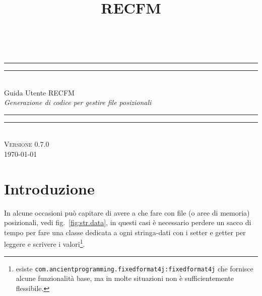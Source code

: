 \documentclass[a4paper,10pt]{report}
\title{RECFM}
\begin{document}
\begin{titlepage}
\newlength{\drop}%
\textheight
\centering
\settowidth{\unitlength}{\large\itshape Generazione di codice per gestire file posizionali}
\vspace*{\baselineskip}
\\[\baselineskip]
\rule{\unitlength}{1.6pt}\vspace*{-\baselineskip}\vspace*{2pt}
\rule{\unitlength}{0.4pt}\\[\baselineskip]
{\Huge Guida Utente RECFM}\\[\baselineskip]
{\large\itshape Generazione di codice per gestire file posizionali}\\[0.2\baselineskip]
\rule{\unitlength}{0.4pt}\vspace*{-\baselineskip}\vspace{3.2pt}
\rule{\unitlength}{1.6pt}\\[\baselineskip]
\vfill
{\large\scshape Versione 0.7.0}\\[\baselineskip]
{\small\scshape \today}\par
\vspace*{\drop}
\end{titlepage}


\section*{Introduzione}
In alcune occasioni può capitare di avere a che fare con file (o aree di 
memoria) posizionali, vedi fig.~\ref{fig:str.data}, in questi casi è necessario 
perdere un sacco di tempo per fare una classe dedicata a ogni stringa-dati con 
i setter e getter per leggere e scrivere i valori\footnote{%
esiste \texttt{com.ancientprogramming.fixedformat4j:fixedformat4j} che 
fornisce alcune funzionalità base, ma in molte situazioni non è sufficientemente
flessibile.
}. 
\end{document}
